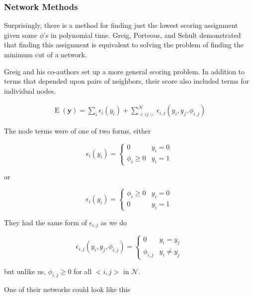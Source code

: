 \subsubsection{Network Methods}
Surprisingly, there is a method for finding just the lowest scoring
assignment given some $\phi$'s in polynomial time. Greig, Porteous,
and Sehult demonstrated that finding this assignment is equivalent to
solving the problem of finding the minimum cut of a 
network.\cite{greig_exact_1989}

Greig and his co-authors set up a more general scoring problem. In
addition to terms that depended upon pairs of neighbors, their score
also included terms for individual nodes.

\begin{align}
\operatorname{E}(\mathbf{y}) = \sum_i\epsilon_i(y_i) + \sum_{<i
  j>}^{\mathcal{N}}\epsilon_{i,j}(y_i,y_j,\phi_{i,j})
\end{align}

\noindent
The node terms were of one of two forms, either

\begin{equation}
\epsilon_{i}(y_i) = \begin{cases}
  0 &y_i = 0 \\
  \phi_{i} \geq 0 &y_i = 1
\end{cases}
\end{equation}

\noindent
or 

\begin{equation}
\epsilon_{i}(y_i) = \begin{cases}
  \phi_{i} \geq 0 &y_i = 0 \\
  0 &y_i = 1
\end{cases}
\end{equation}

\noindent
They had the same form of $\epsilon_{i,j}$ as we do

\begin{equation}
\epsilon_{i,j}(y_i,y_j,\phi_{i,j}) = \begin{cases}
  0 &y_i = y_j \\
  \phi_{i,j} &y_i \neq y_j
\end{cases}
\end{equation}

\noindent
but unlike us, $\phi_{i,j} \geq 0$ for all $<i, j>$ in $\mathcal{N}$. 

One of their networks could look like this

\begin{figure}[!h]
\centering


\end{figure}

